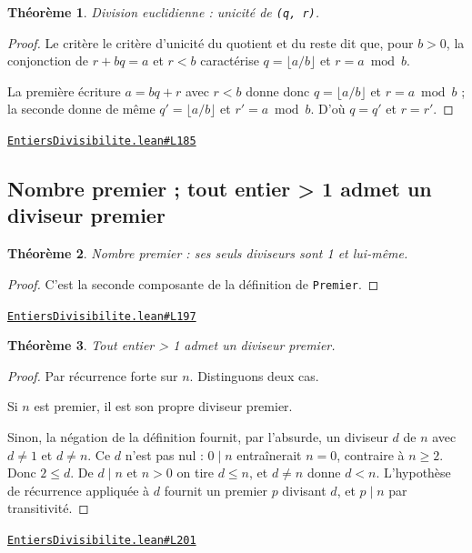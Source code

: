 \documentclass[11pt,a4paper]{article}
\theoremstyle{definition}
\theoremstyle{plain}
\newtheorem{theoreme}{Théorème}
\newcommand{\source}[2]{\par\smallskip\noindent\hfill{\footnotesize\href{#1}{\texttt{#2}}}\par\smallskip}
\begin{document}
\begin{theoreme}
Division euclidienne : unicité de \texttt{(q, r)}.
\end{theoreme}

\begin{proof}
Le critère le critère d'unicité du quotient et du reste dit que, pour $b > 0$, la conjonction de
$r + bq = a$ et $r < b$ caractérise $q = \lfloor a/b \rfloor$ et $r = a \bmod b$.

La première écriture $a = bq + r$ avec $r < b$ donne donc $q = \lfloor a/b \rfloor$ et
$r = a \bmod b$ ; la seconde donne de même $q' = \lfloor a/b \rfloor$ et
$r' = a \bmod b$. D'où $q = q'$ et $r = r'$.
\end{proof}
\source{https://github.com/Commutator-IO/learn-lean/blob/main/cours/01-college/01-nombres-et-calculs/EntiersDivisibilite.lean\#L185}{EntiersDivisibilite.lean\#L185}

\subsection{Nombre premier ; tout entier > 1 admet un diviseur premier}

\begin{theoreme}
Nombre premier : ses seuls diviseurs sont 1 et lui-même.
\end{theoreme}

\begin{proof}
C'est la seconde composante de la définition de \texttt{Premier}.
\end{proof}
\source{https://github.com/Commutator-IO/learn-lean/blob/main/cours/01-college/01-nombres-et-calculs/EntiersDivisibilite.lean\#L197}{EntiersDivisibilite.lean\#L197}

\begin{theoreme}
Tout entier > 1 admet un diviseur premier.
\end{theoreme}

\begin{proof}
Par récurrence forte sur $n$. Distinguons deux cas.

Si $n$ est premier, il est son propre diviseur premier.

Sinon, la négation de la définition fournit, par l'absurde, un diviseur $d$ de $n$ avec
$d \ne 1$ et $d \ne n$. Ce $d$ n'est pas nul : $0 \mid n$ entraînerait $n = 0$, contraire
à $n \ge 2$. Donc $2 \le d$. De $d \mid n$ et $n > 0$ on tire $d \le n$, et $d \ne n$
donne $d < n$. L'hypothèse de récurrence appliquée à $d$ fournit un premier $p$ divisant
$d$, et $p \mid n$ par transitivité.
\end{proof}
\source{https://github.com/Commutator-IO/learn-lean/blob/main/cours/01-college/01-nombres-et-calculs/EntiersDivisibilite.lean\#L201}{EntiersDivisibilite.lean\#L201}
\end{document}
